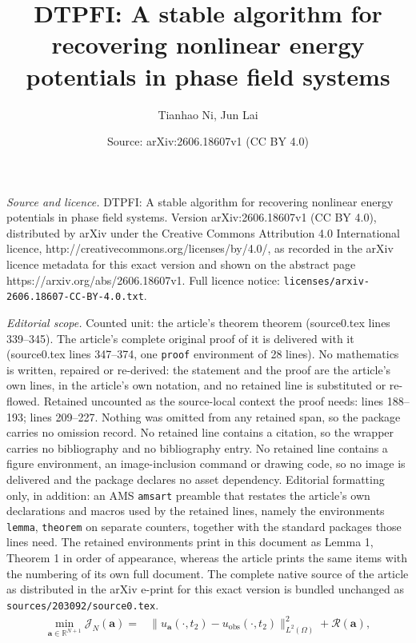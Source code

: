 \documentclass[10pt,a4paper]{amsart}
\title{DTPFI: A stable algorithm for recovering nonlinear energy potentials in phase field systems}
\author{Tianhao Ni, Jun Lai}
\date{Source: arXiv:2606.18607v1 (CC BY 4.0)}
\begin{document}
\maketitle

\noindent\emph{Source and licence.} DTPFI: A stable algorithm for recovering nonlinear energy potentials in phase field systems. Version arXiv:2606.18607v1 (CC BY 4.0), distributed by arXiv under the Creative Commons Attribution 4.0 International licence, http://creativecommons.org/licenses/by/4.0/, as recorded in the arXiv licence metadata for this exact version and shown on the abstract page https://arxiv.org/abs/2606.18607v1. Full licence notice: \texttt{licenses/arxiv-2606.18607-CC-BY-4.0.txt}.\par\smallskip

\noindent\textit{Editorial scope.} Counted unit: the article's theorem theorem (source0.tex lines 339--345). The article's complete original proof of it is delivered with it (source0.tex lines 347--374, one \texttt{proof} environment of 28 lines). No mathematics is written, repaired or re-derived: the statement and the proof are the article's own lines, in the article's own notation, and no retained line is substituted or re-flowed.  Retained uncounted as the source-local context the proof needs: lines 188--193; lines 209--227.  Nothing was omitted from any retained span, so the package carries no omission record.  No retained line contains a citation, so the wrapper carries no bibliography and no bibliography entry.  No retained line contains a figure environment, an image-inclusion command or drawing code, so no image is delivered and the package declares no asset dependency.  Editorial formatting only, in addition: an AMS \texttt{amsart} preamble that restates the article's own declarations and macros used by the retained lines, namely the environments \texttt{lemma}, \texttt{theorem} on separate counters, together with the standard packages those lines need.  The retained environments print in this document as Lemma 1, Theorem 1 in order of appearance, whereas the article prints the same items with the numbering of its own full document.  The complete native source of the article as distributed in the arXiv e-print for this exact version is bundled unchanged as \texttt{sources/203092/source0.tex}.
\begin{equation}
	\label{equ:opt2}
	\begin{aligned}
		\min\limits_{\mathbf{a} \in \mathbb{R}^{N+1}} \mathcal{J}_N(\mathbf{a}) = & \|u_{\mathbf{a}}(\cdot,t_2) - u_{\text{obs}}(\cdot,t_2)\|_{L^2(\Omega)}^2 +  \mathcal{R}(\mathbf{a}), 
	\end{aligned}
\end{equation}
\end{document}
